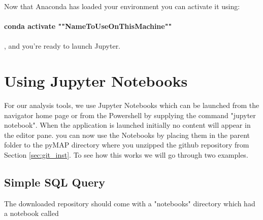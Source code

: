 \documentclass{article}
\begin{document}
Now that Anaconda has loaded your environment you can activate it using: \\ \\
\textbf{conda activate  ""NameToUseOnThisMachine"" } \\ \\

 , and you're ready to launch Jupyter.


 \section{Using Jupyter Notebooks}

 For our analysis tools, we use Jupyter Notebooks which can be launched from the navigator home page or from the Powershell by supplying the command "jupyter notebook". When the application is launched initially no content will appear in the editor pane. you can now use the Notebooks by placing them in the parent folder to the pyMAP directory where you unzipped the github repository from Section \ref{sec:git_inst}. To see how this works we will go through two examples. 

\subsection{Simple SQL Query}
The downloaded repository should come with a "notebooks" directory which had a notebook called 
\end{document}
